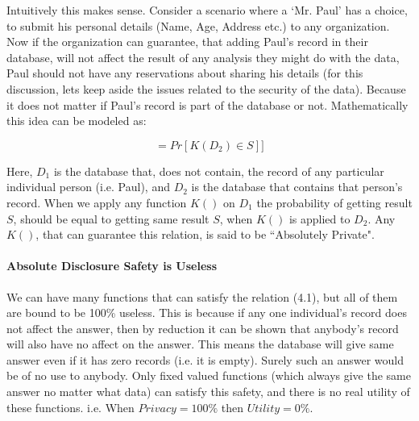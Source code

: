 \documentclass[12pt]{report}
\theoremstyle{named}
\begin{document}
Intuitively this makes sense. Consider a scenario where a `Mr. Paul' has a choice, to submit his personal details (Name, Age, Address etc.) to any organization.  Now if the organization can guarantee, that adding Paul's record in their database, will not affect the result of any analysis they might do with the data, Paul should not have any reservations about sharing his details (for this discussion, lets keep aside the issues related to the security of the data). Because it does not matter if Paul's record is part of the database or not. Mathematically this idea can be modeled as:

\begin{equation}
[Pr[\mathit{K}(D_{1})\in S]  = Pr[\mathit{K}(D_{2})\in S]]
\end{equation}

Here, $D_{1}$ is the database that, does not contain, the record of any particular individual person (i.e. Paul), and  $D_{2}$ is the database that contains that person's record. When we apply any function $K()$ on  $D_{1}$ the probability of getting result $S$, should be equal to getting same result $S$, when $K()$ is applied to $D_{2}$. Any $K()$, that can guarantee this relation, is said to be ``Absolutely Private".

\paragraph{Absolute Disclosure Safety is Useless\\}
We can have many functions that can satisfy the relation (4.1), but all of them are bound to be 100\% useless. This is because if any one individual's record does not affect the answer, then by reduction it can be shown that anybody's record will also have no affect on the answer. This means the database will give same answer even if it has zero records (i.e. it is empty). Surely such an answer would be of no use to anybody. Only fixed valued functions (which always give the same answer no matter what data) can satisfy this safety, and there is no real utility of these functions. i.e. When $Privacy = 100\%$ then $Utility = 0\%$.

\end{document}

